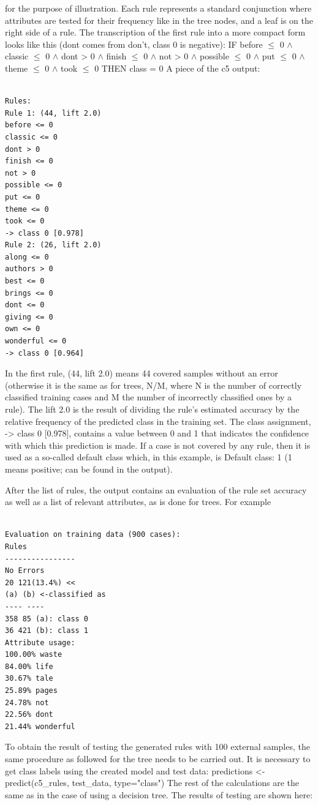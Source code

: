 \documentclass[11pt,openany,executivepaper]{book}
\begin{document}
for the purpose of illustration. Each rule represents a standard conjunction where
attributes are tested for their frequency like in the tree nodes, and a leaf is on the
right side of a rule. The transcription of the first rule into a more compact form
looks like this (dont comes from don’t, class 0 is negative):
IF before $\leq$ 0 $\wedge$ classic $\leq$ 0 $\wedge$ dont > 0 $\wedge$ finish $\leq$ 0 $\wedge$ not > 0 $\wedge$ possible
$\leq$ 0 $\wedge$ put $\leq$ 0 $\wedge$ theme $\leq$ 0 $\wedge$ took $\leq$ 0 THEN class = 0
A piece of the c5 output:

\begin{verbatim}

Rules:
Rule 1: (44, lift 2.0)
before <= 0
classic <= 0
dont > 0
finish <= 0
not > 0
possible <= 0
put <= 0
theme <= 0
took <= 0
-> class 0 [0.978]
Rule 2: (26, lift 2.0)
along <= 0
authors > 0
best <= 0
brings <= 0
dont <= 0
giving <= 0
own <= 0
wonderful <= 0
-> class 0 [0.964]
\end{verbatim}

In the first rule, (44, lift 2.0) means 44 covered samples without an
error (otherwise it is the same as for trees, N/M, where N is the number of correctly classified training cases and M the number of incorrectly classified ones
by a rule). The lift 2.0 is the result of dividing the rule’s estimated accuracy
by the relative frequency of the predicted class in the training set.
The class assignment, -> class 0 [0.978], contains a value between
0 and 1 that indicates the confidence with which this prediction is made. If a case
is not covered by any rule, then it is used as a so-called default class which, in this
example, is Default class: 1 (1 means positive; can be found in the output).

After the list of rules, the output contains an evaluation of the rule set accuracy as well as a list of relevant attributes, as is done for trees. For example

\begin{verbatim}

Evaluation on training data (900 cases):
Rules
----------------
No Errors
20 121(13.4%) <<
(a) (b) <-classified as
---- ----
358 85 (a): class 0
36 421 (b): class 1
Attribute usage:
100.00% waste
84.00% life
30.67% tale
25.89% pages
24.78% not
22.56% dont
21.44% wonderful
\end{verbatim}

To obtain the result of testing the generated rules with 100 external samples,
the same procedure as followed for the tree needs to be carried out. It is necessary
to get class labels using the created model and test data:
predictions <- predict(c5\_rules, test\_data, type="class")
The rest of the calculations are the same as in the case of using a decision
tree. The results of testing are shown here:
\end{document}
